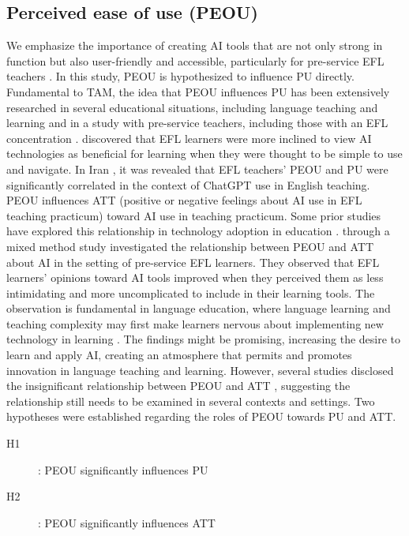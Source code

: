 \documentclass[english]{textolivre}
\begin{document}
\subsection{Perceived ease of use (PEOU)}\label{sec-conduta}
We emphasize the importance of creating AI tools that are not only strong in function but also user-friendly and accessible, particularly for pre-service EFL teachers \cite{davis1989tam}. In this study, PEOU is hypothesized to influence PU directly. Fundamental to TAM, the idea that PEOU influences PU has been extensively researched in several educational situations, including language teaching and learning and in a study with pre-service teachers, including those with an EFL concentration \cite{allali2024chatgpt,dehghani2024chatgpt,liu2023chatgpt,ma2024tam,wu2023aiuse,zou2023speechai}. \textcite{wu2023aiuse} discovered that EFL learners were more inclined to view AI technologies as beneficial for learning when they were thought to be simple to use and navigate. In Iran \cite{dehghani2024chatgpt}, it was revealed that EFL teachers’ PEOU and PU were significantly correlated in the context of ChatGPT use in English teaching. PEOU influences ATT (positive or negative feelings about AI use in EFL teaching practicum) toward AI use in teaching practicum. Some prior studies have explored this relationship in technology adoption in education \cite{alabdullatif2023chatbots,chen2024mr,ma2024tam,wu2023aiuse,yuviler2024chatbot}. \textcite{wu2023aiuse} through a mixed method study investigated the relationship between PEOU and ATT about AI in the setting of pre-service EFL learners. They observed that EFL learners’ opinions toward AI tools improved when they perceived them as less intimidating and more uncomplicated to include in their learning tools. The observation is fundamental in language education, where language learning and teaching complexity may first make learners nervous about implementing new technology in learning \cite{wu2023aiuse}. The findings might be promising, increasing the desire to learn and apply AI, creating an atmosphere that permits and promotes innovation in language teaching and learning. However, several studies disclosed the insignificant relationship between PEOU and ATT \cite{alabdullatif2023chatbots,chen2024mr,yuviler2024chatbot}, suggesting the relationship still needs to be examined in several contexts and settings. Two hypotheses were established regarding the roles of PEOU towards PU and ATT. 

\begin{description}
    \item[H1]: PEOU significantly influences PU
    \item[H2]: PEOU significantly influences ATT
\end{description}
\end{document}

